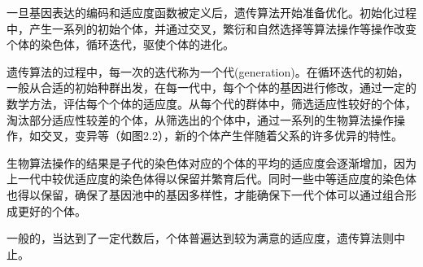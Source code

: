 一旦基因表达的编码和适应度函数被定义后，遗传算法开始准备优化。初始化过程中，产生一系列的初始个体，并通过交叉，繁衍和自然选择等算法操作等操作改变个体的染色体，循环迭代，驱使个体的进化。

遗传算法的过程中，每一次的迭代称为一个代(generation)。在循环迭代的初始，一般从合适的初始种群出发，在每一代中，每个个体的基因进行修改，通过一定的数学方法，评估每个个体的适应度。从每个代的群体中，筛选适应性较好的个体，淘汰部分适应性较差的个体，从筛选出的个体中，通过一系列的生物算法操作操作，如交叉，变异等（如图2.2），新的个体产生伴随着父系的许多优异的特性。

生物算法操作的结果是子代的染色体对应的个体的平均的适应度会逐渐增加，因为上一代中较优适应度的染色体得以保留并繁育后代。同时一些中等适应度的染色体也得以保留，确保了基因池中的基因多样性，才能确保下一代个体可以通过组合形成更好的个体。

一般的，当达到了一定代数后，个体普遍达到较为满意的适应度，遗传算法则中止。

